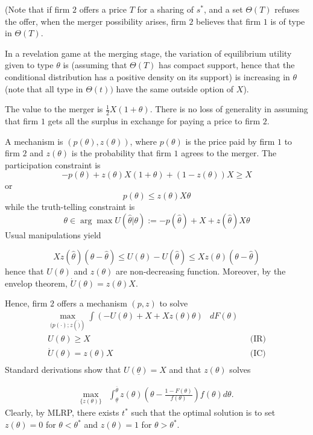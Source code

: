 \documentclass[a4paper]{article}
\renewcommand{\th}{\hat\theta}
\renewcommand{\t}{\theta}
\begin{document}
(Note that if firm $2$ offers a price $T$ for a sharing of $s^*$, and a set $\Theta(T)$ refuses the offer, when the merger possibility arises, firm $2$ believes that firm $1$ is of type in $\Theta(T)$. 

In a revelation game at the merging stage, the variation of equilibrium utility given to type $\t$ is (assuming that $\Theta(T)$ has compact support, hence that the conditional distribution has a positive density on its support) is increasing in $\t$ (note that all type in $\Theta(t))$ have the same outside option of $X$).

The value to the merger is $\frac{1}{2}X(1+\t)$. There is no loss of generality in assuming that firm $1$ gets all the surplus in exchange for paying a price to firm $2$. 

A mechanism is $(p(\t),z(\t))$, where $p(\t)$ is the price paid by firm $1$ to firm $2$ and $z(\t)$ is the probability that firm $1$ agrees to the merger. The participation constraint is
\begin{equation}
  -p(\t)+z(\t)X(1+\t)+(1-z(\t))X\geq X 
\end{equation}
or
\begin{equation*}
  p(\t)\leq z(\t)X \t
\end{equation*}
while the truth-telling constraint is
\begin{equation*}
  \t \in \arg\max U(\th|\t):=-p(\th)+X+ z(\th)X\t
\end{equation*}
%
Usual manipulations yield 

%
\[
  X z(\th)(\t-\th)\leq U(\t)-U(\th)\leq Xz(\t)(\t-\th)
\]
%
hence that $U(\t)$ and $z(\t)$ are non-decreasing function. Moreover, by the envelop theorem, $\dot U(\theta)=z(\t)X$. 

Hence, firm $2$ offers a mechanism $(p,z)$ to solve
\begin{align*}
  \max_{(p(\cdot);z(\dot))} \int \left(-U(\t)+X+Xz(\t)\t \right)&dF(\t)\\ 
  U(\t) \geq X & \hspace{2cm} \text{(IR)} \\ 
  \dot{U}(\t)=z(\t)X & \hspace{2cm} \text{(IC)} \\ 
\end{align*}
Standard derivations show that $U(\underline \t)=X$ and that $z(\t)$ solves  

\begin{align*}
\max_{\{z(\t)\}} &\int_{\underline \t}^{\overline \t}z(\t)\left( \t-\frac{1-F(\t)}{f(\t)}\right)f(\t)d\t.
\end{align*}
%
Clearly, by MLRP, there exists $t^*$ such that the optimal solution is to set $z(\t)=0$ for $\t<\t^*$ and $z(\t)=1$ for $\t>\t^*$. 
%
\end{document}
